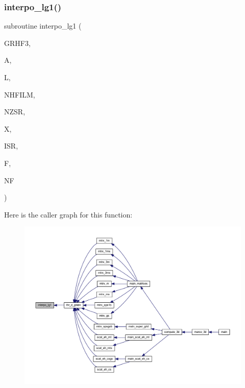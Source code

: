 \subsubsection{\texorpdfstring{interpo\+\_\+lg1()}{interpo\_lg1()}}
{\footnotesize\ttfamily subroutine interpo\+\_\+lg1 (\begin{DoxyParamCaption}\item[{complex, dimension(11,nhfilm,nzsr)}]{G\+R\+H\+F3,  }\item[{real, dimension(l)}]{A,  }\item[{integer}]{L,  }\item[{integer}]{N\+H\+F\+I\+LM,  }\item[{integer}]{N\+Z\+SR,  }\item[{real}]{X,  }\item[{integer}]{I\+SR,  }\item[{complex, dimension(nf)}]{F,  }\item[{integer}]{NF }\end{DoxyParamCaption})}

Here is the caller graph for this function\+:
\nopagebreak
\begin{figure}[H]
\begin{center}
\leavevmode
\includegraphics[width=350pt]{Marco_8f90_a3fe5c8bfe5e5729f1b02af3926c68dbc_icgraph}
\end{center}
\end{figure}
\mbox{\label{Marco_8f90_a351cb438e704ef189fa972f9590cbd80}} 
